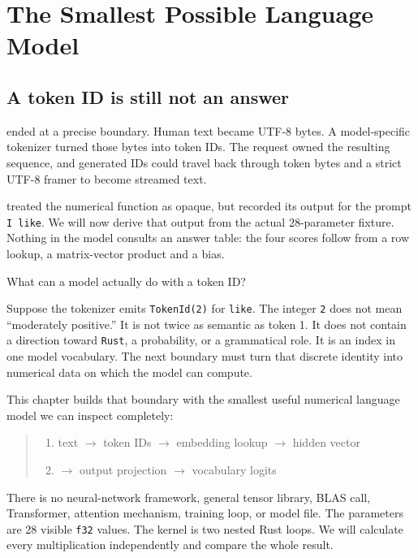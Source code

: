 \chapter{The Smallest Possible Language Model}\label{chapter-3-the-smallest-possible-language-model}\label{app:smallest-model}
\section{A token ID is still not an
answer}\label{a-token-id-is-still-not-an-answer}

 ended at a precise boundary. Human text became UTF-8 bytes. A
model-specific tokenizer turned those bytes into token IDs. The request
owned the resulting sequence, and generated IDs could travel back
through token bytes and a strict UTF-8 framer to become streamed text.

 treated the numerical function as opaque, but recorded its output
for the prompt \texttt{I like}. We will now derive that output from the
actual 28-parameter fixture. Nothing in the model consults an answer table:
the four scores follow from a row lookup, a matrix-vector product and a bias.

What can a model actually do with a token ID?

Suppose the tokenizer emits \texttt{TokenId(2)} for \texttt{like}. The
integer \texttt{2} does not mean ``moderately positive.'' It is not
twice as semantic as token 1. It does not contain a direction toward
\texttt{Rust}, a probability, or a grammatical role. It is an index in
one model vocabulary. The next boundary must turn that discrete identity
into numerical data on which the model can compute.

This chapter builds that boundary with the smallest useful numerical
language model we can inspect completely:

\begin{quote}
\begin{enumerate}
\item text  \(\longrightarrow\)  token IDs  \(\longrightarrow\)  embedding lookup  \(\longrightarrow\)  hidden vector
\item \(\longrightarrow\)  output projection  \(\longrightarrow\)  vocabulary logits
\end{enumerate}
\end{quote}

There is no neural-network framework, general tensor library, BLAS call,
Transformer, attention mechanism, training loop, or model file. The
parameters are 28 visible \texttt{f32} values. The kernel is two nested
Rust loops. We will calculate every multiplication independently and
compare the whole result.

